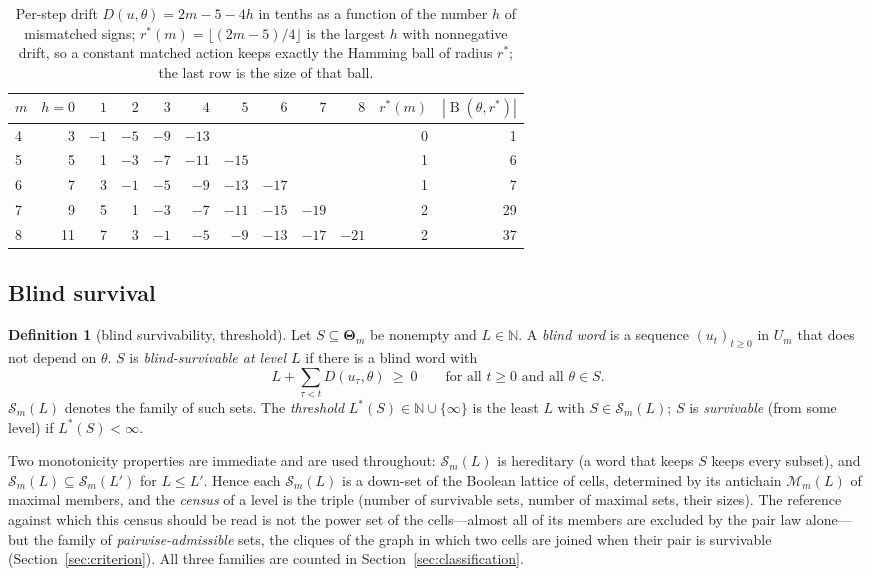 \documentclass[11pt,a4paper]{article}
\theoremstyle{plain}
\theoremstyle{definition}
\newtheorem{definition}[theorem]{Definition}
\theoremstyle{remark}
\newcommand{\N}{\mathbb{N}}
\newcommand{\calM}{\mathcal{M}}
\newcommand{\calS}{\mathcal{S}}
\let\GreekTheta\Theta
\renewcommand{\Theta}{\boldsymbol{\GreekTheta}}
\newcommand{\Ball}{\operatorname{B}}
\newcommand{\Lstar}{L^{\ast}}
\begin{document}
\begin{table}[t]
\centering\small
\caption{Per-step drift $D(u,\theta)=2m-5-4h$ in tenths as a function of the number $h$ of mismatched signs; $r^\ast(m)=\lfloor(2m-5)/4\rfloor$ is the largest $h$ with nonnegative drift, so a constant matched action keeps exactly the Hamming ball of radius $r^\ast$; the last row is the size of that ball.}
\label{tab:drift}
\begin{tabular}{lrrrrrrrrr|rr}
\toprule
$m$ & $h{=}0$ & $1$ & $2$ & $3$ & $4$ & $5$ & $6$ & $7$ & $8$ & $r^\ast(m)$ & $|\Ball(\theta,r^\ast)|$\\
\midrule
4 & 3 & $-1$ & $-5$ & $-9$ & $-13$ & & & & & 0 & 1\\
5 & 5 & 1 & $-3$ & $-7$ & $-11$ & $-15$ & & & & 1 & 6\\
6 & 7 & 3 & $-1$ & $-5$ & $-9$ & $-13$ & $-17$ & & & 1 & 7\\
7 & 9 & 5 & 1 & $-3$ & $-7$ & $-11$ & $-15$ & $-19$ & & 2 & 29\\
8 & 11 & 7 & 3 & $-1$ & $-5$ & $-9$ & $-13$ & $-17$ & $-21$ & 2 & 37\\
\bottomrule
\end{tabular}
\end{table}

\subsection{Blind survival}
\begin{definition}[blind survivability, threshold]\label{def:blind}
Let $S\subseteq\Theta_m$ be nonempty and $L\in\N$. A \emph{blind word} is a sequence $(u_t)_{t\ge0}$ in $U_m$ that does not depend on $\theta$. $S$ is \emph{blind-survivable at level $L$} if there is a blind word with
\[L+\sum_{\tau<t}D(u_\tau,\theta)\ \ge\ 0\qquad\text{for all }t\ge0\text{ and all }\theta\in S .\]
$\calS_m(L)$ denotes the family of such sets. The \emph{threshold} $\Lstar(S)\in\N\cup\{\infty\}$ is the least $L$ with $S\in\calS_m(L)$; $S$ is \emph{survivable} (from some level) if $\Lstar(S)<\infty$.
\end{definition}

Two monotonicity properties are immediate and are used throughout: $\calS_m(L)$ is hereditary (a word that keeps $S$ keeps every subset), and $\calS_m(L)\subseteq\calS_m(L')$ for $L\le L'$. Hence each $\calS_m(L)$ is a down-set of the Boolean lattice of cells, determined by its antichain $\calM_m(L)$ of maximal members, and the \emph{census} of a level is the triple (number of survivable sets, number of maximal sets, their sizes). The reference against which this census should be read is not the power set of the cells---almost all of its members are excluded by the pair law alone---but the family of \emph{pairwise-admissible} sets, the cliques of the graph in which two cells are joined when their pair is survivable (Section~\ref{sec:criterion}). All three families are counted in Section~\ref{sec:classification}.
\end{document}
